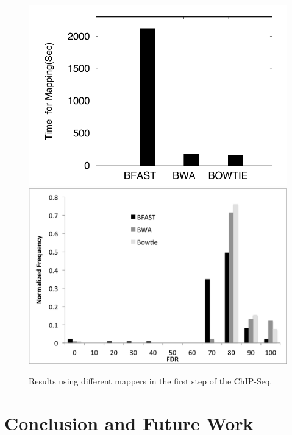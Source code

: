 \documentclass{cpeauth}
\begin{document}
\begin{figure}
 \centering


\includegraphics[bb=0 0 300 300,scale=0.39]{figures/chip-seq-mapper-dependency-ttc.pdf}
\includegraphics[bb=0 0 300 300,scale=0.39]{figures/chip-seq-mapper-dependency-results.pdf}

\caption{\small Results using different mappers in the first step of the ChIP-Seq.  }
  \label{fig:chip-seq-comp} 
 \end{figure}



\section{Conclusion and Future Work}
\end{document}
